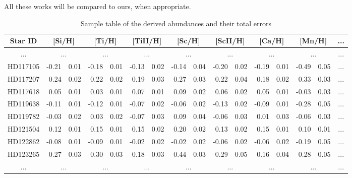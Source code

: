 \documentclass[dvips,12pt,a4paper]{report}
\begin{document}
{{All these works will be compared to ours, when appropriate.
\begin{table}[h]\scriptsize
\centering
\caption[Sample table of the abundance derived for the species]{Sample table of the derived abundances and their total errors}
  \label{abundance_table}
  \begin{tabular}{ c r@{$\pm$}l r@{$\pm$}l r@{$\pm$}l r@{$\pm$}l r@{$\pm$}l r@{$\pm$}l r@{$\pm$}l c}
  \hline
  \hline
Star ID & \multicolumn {2}{c}{[Si/H]} & \multicolumn {2}{c}{[Ti/H]} & \multicolumn {2}{c}{[TiII/H]} & \multicolumn {2}{c}{[Sc/H]} & \multicolumn {2}{c}{[ScII/H]} & \multicolumn {2}{c}{[Ca/H]} & \multicolumn {2}{c}{[Mn/H]} & ... \\
\hline
... & \multicolumn {2}{c}{...} & \multicolumn {2}{c}{...} & \multicolumn {2}{c}{...} & \multicolumn {2}{c}{...} & \multicolumn {2}{c}{...} & \multicolumn {2}{c}{...} & \multicolumn {2}{c}{...} & ... \\
HD117105 & -0.21 & 0.01 & -0.18 & 0.01 & -0.13 & 0.02 & -0.14 & 0.04 & -0.20 & 0.02 & -0.19 & 0.01 & -0.49 & 0.05 & ...\\
HD117207 &  0.24 & 0.02 &  0.22 & 0.02 &  0.19 & 0.03 &  0.27 & 0.03 &  0.22 & 0.04 &  0.18 & 0.02 &  0.33 & 0.03 & ...\\
HD117618 &  0.05 & 0.01 &  0.03 & 0.01 &  0.07 & 0.01 &  0.09 & 0.02 &  0.06 & 0.02 &  0.05 & 0.01 & -0.03 & 0.03 & ...\\
HD119638 & -0.11 & 0.01 & -0.12 & 0.01 & -0.07 & 0.02 & -0.06 & 0.02 & -0.13 & 0.02 & -0.09 & 0.01 & -0.28 & 0.05 & ...\\
HD119782 & -0.03 & 0.02 &  0.03 & 0.02 & -0.07 & 0.03 &  0.09 & 0.04 & -0.06 & 0.03 &  0.01 & 0.03 & -0.06 & 0.03 & ...\\
HD121504 &  0.12 & 0.01 &  0.15 & 0.01 &  0.15 & 0.02 &  0.20 & 0.02 &  0.13 & 0.02 &  0.15 & 0.01 &  0.10 & 0.01 & ...\\
HD122862 & -0.08 & 0.01 & -0.09 & 0.01 & -0.02 & 0.02 & -0.02 & 0.02 & -0.06 & 0.02 & -0.06 & 0.02 & -0.19 & 0.05 & ...\\
HD123265 &  0.27 & 0.03 &  0.30 & 0.03 &  0.18 & 0.03 &  0.44 & 0.03 &  0.29 & 0.05 &  0.16 & 0.04 &  0.28 & 0.05 & ...\\
... & \multicolumn {2}{c}{...} & \multicolumn {2}{c}{...} & \multicolumn {2}{c}{...} & \multicolumn {2}{c}{...} & \multicolumn {2}{c}{...} & \multicolumn {2}{c}{...} & \multicolumn {2}{c}{...}  & ... \\
\hline
\end{tabular}
\end{table}

}}
\end{document}

